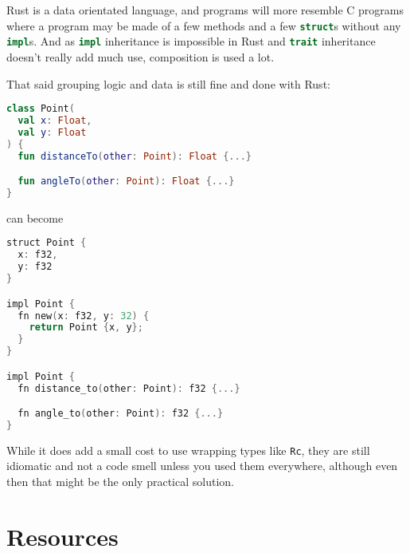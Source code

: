 \documentclass[a4paper,11pt]{article}
\begin{document}
Rust is a data orientated language, and programs will more resemble C programs where a program may be made of a few methods and a few \lstinline[language=Rust]{struct}s without any \lstinline[language=Rust]{impl}s.
And as \lstinline[language=Rust]{impl} inheritance is impossible in Rust and \lstinline[language=Rust]{trait} inheritance doesn't really add much use, composition is used a lot.
\newline

That said grouping logic and data is still fine and done with Rust:

\begin{lstlisting}[language=Kotlin,frame=single]
class Point(
  val x: Float,
  val y: Float
) {
  fun distanceTo(other: Point): Float {...}

  fun angleTo(other: Point): Float {...}
}
\end{lstlisting}
can become
\begin{lstlisting}[language=Kotlin,frame=single]
struct Point {
  x: f32,
  y: f32
}

impl Point {
  fn new(x: f32, y: 32) {
    return Point {x, y};
  }
}

impl Point {
  fn distance_to(other: Point): f32 {...}

  fn angle_to(other: Point): f32 {...}
}
\end{lstlisting}

While it does add a small cost to use wrapping types like \lstinline[language=Rust]{Rc}, they are still idiomatic and not a code smell unless you used them everywhere, although even then that might be the only practical solution. 

\newpage
\section{Resources}
\end{document}
